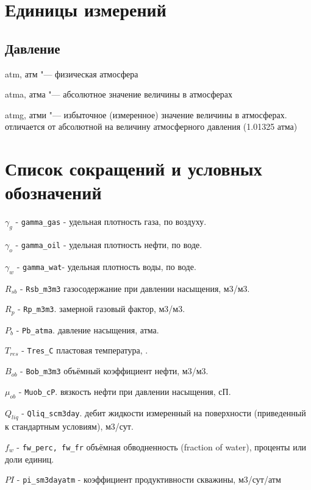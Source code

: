 \chapter*{Единицы измерений} %
\noindent

\section*{Давление}
 
 atm, атм "--- физическая атмосфера 
 
 atma, атма "--- абсолютное значение величины в атмосферах
 
 atmg, атми "--- избыточное (измеренное) значение величины в атмосферах. отличается от абсолютной на величину атмосферного давления (1.01325 атма)

\chapter*{Список сокращений и условных обозначений} %
\noindent

$\gamma_g$  - \texttt{gamma_gas} - удельная плотность газа, по воздуху. 

$\gamma_o$  - \texttt{gamma_oil} - удельная плотность нефти, по воде.

$\gamma_w$  - \texttt{gamma_wat}- удельная плотность воды, по воде. 

$R_{sb}$ - \texttt{Rsb_m3m3} газосодержание при давлении насыщения, м3/м3. 

$R_p$ - \texttt{Rp_m3m3}. замерной газовый фактор, м3/м3.

$P_b$ - \texttt{Pb_atma}. давление насыщения, атма.  

$T_{res}$ - \texttt{Tres_C} пластовая температура, \textcelsius. 

$B_{ob}$ - \texttt{Bob_m3m3} объёмный коэффициент нефти, м3/м3. 

$\mu_{ob}$ - \texttt{Muob_cP}. вязкость нефти при давлении насыщения, сП. 

$Q_{liq}$ - \texttt{Qliq_scm3day}. дебит жидкости измеренный на поверхности (приведенный к стандартным условиям), м3/сут. 

$f_{w}$ - \texttt{fw_perc, fw_fr} объёмная обводненность (fraction of water), проценты или доли единиц. 

$PI$ - \texttt{pi_sm3dayatm} - коэффициент продуктивности скважины, м3/сут/атм
